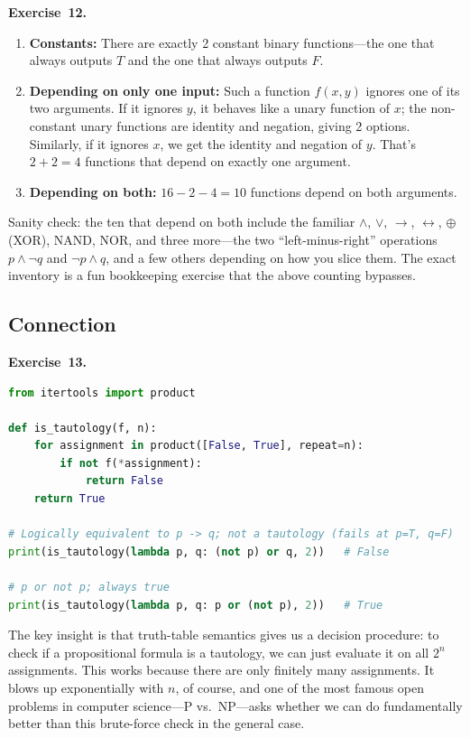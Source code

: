 \documentclass[11pt]{article}
\begin{document}
\medskip
\textbf{Exercise~12.}
\begin{enumerate}[label=(\alph*)]
  \item \textbf{Constants:} There are exactly 2 constant binary functions---the one that always outputs $T$ and the one that always outputs $F$.
  \item \textbf{Depending on only one input:} Such a function $f(x, y)$ ignores one of its two arguments. If it ignores $y$, it behaves like a unary function of $x$; the non-constant unary functions are identity and negation, giving 2 options. Similarly, if it ignores $x$, we get the identity and negation of $y$. That's $2 + 2 = 4$ functions that depend on exactly one argument.
  \item \textbf{Depending on both:} $16 - 2 - 4 = 10$ functions depend on both arguments.
\end{enumerate}
Sanity check: the ten that depend on both include the familiar $\wedge$, $\vee$, $\to$, $\leftrightarrow$, $\oplus$ (XOR), NAND, NOR, and three more---the two ``left-minus-right'' operations $p \wedge \lnot q$ and $\lnot p \wedge q$, and a few others depending on how you slice them. The exact inventory is a fun bookkeeping exercise that the above counting bypasses.

\subsection*{Connection}

\textbf{Exercise~13.}
\begin{lstlisting}[language=Python]
from itertools import product

def is_tautology(f, n):
    for assignment in product([False, True], repeat=n):
        if not f(*assignment):
            return False
    return True

# Logically equivalent to p -> q; not a tautology (fails at p=T, q=F)
print(is_tautology(lambda p, q: (not p) or q, 2))   # False

# p or not p; always true
print(is_tautology(lambda p, q: p or (not p), 2))   # True
\end{lstlisting}

The key insight is that truth-table semantics gives us a decision procedure: to check if a propositional formula is a tautology, we can just evaluate it on all $2^n$ assignments. This works because there are only finitely many assignments. It blows up exponentially with $n$, of course, and one of the most famous open problems in computer science---P vs.\ NP---asks whether we can do fundamentally better than this brute-force check in the general case.
\end{document}
